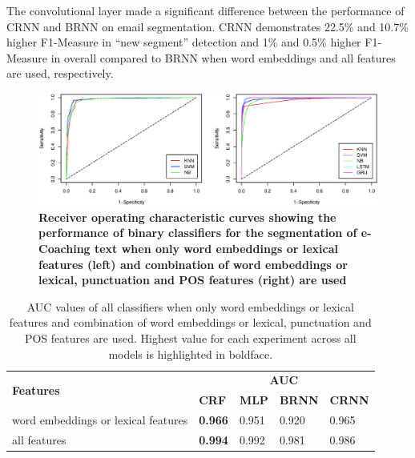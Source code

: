 \documentclass{amia}
\begin{document}
The convolutional layer made a significant difference between the performance of CRNN and BRNN on email segmentation. CRNN demonstrates 22.5\% and 10.7\% higher F1-Measure in ``new segment'' detection and 1\% and 0.5\% higher F1-Measure in overall compared to BRNN when word embeddings and all features are used, respectively. \\  

\begin{figure}[!htb]
    \centering
    \includegraphics[width=1.0\textwidth]{figures/roc-curves.eps}
    \caption{\textbf{Receiver operating characteristic curves showing the performance of binary classifiers for the segmentation of e-Coaching text when only word embeddings or lexical features (left) and combination of word embeddings or lexical, punctuation and POS features (right) are used}}
    \label{fig:roc-curves}
\end{figure}

\begin{table}[ht]
\centering
\caption{AUC values of all classifiers when only word embeddings or lexical features and combination of word embeddings or lexical, punctuation and POS features are used. Highest value for each experiment across all models is highlighted in boldface.}
\label{tab:result_roc}
 \begin{tabular}{|l|l|l|l|l|}
  \hline
\multirow{2}{*}{\textbf{Features}} & \multicolumn{4}{|c|}{\textbf{AUC}} \\\cline{2-5}
 & \textbf{CRF} & \textbf{MLP}  & \textbf{BRNN} & \textbf{CRNN} \\ \hline      
 word embeddings or lexical features & \textbf{0.966} & 0.951 & 0.920 & 0.965 \\ \hline
 all features & \textbf{0.994} & 0.992 & 0.981 & 0.986 \\ \hline
  \end{tabular}
\end{table}      

\end{document}
